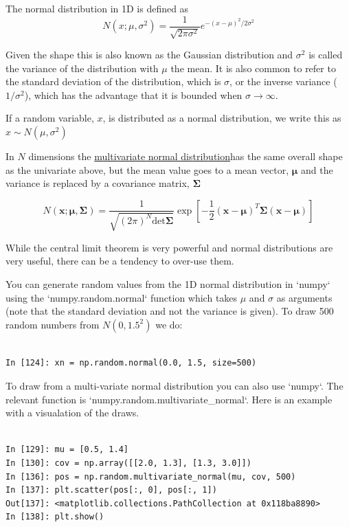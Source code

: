 \documentclass[a4paper,10pt]{article}
\begin{document}
The normal distribution in 1D is defined as
$$N(x; \mu, \sigma^2)= \frac{1}{\sqrt{2\pi {\sigma^2}}} e^{-(x-\mu)^2/2\sigma^2}$$

Given the shape this is also known as the Gaussian distribution and $\sigma^2$ is called the variance of the distribution with $\mu$ the mean. It is also common to refer to the standard deviation of the distribution, which is $\sigma$, or the inverse variance ($1/\sigma^2$), which has the advantage that it is bounded when $\sigma \to \infty$.

If a random variable, $x$, is distributed as a normal distribution, we write this as $x\sim N(\mu, \sigma^2)$

In $N$ dimensions the \href{https://en.wikipedia.org/wiki/Multivariate_normal_distribution}{multivariate normal distribution}has the same overall shape as the univariate above, but the mean value goes to a mean vector, $\mathbf{\mu}$ and the variance is replaced by a covariance matrix, $\mathbf{\Sigma}$


$$N(\mathbf{x}; \mathbf{\mu}, \mathbf{\Sigma})= \frac{1}{\sqrt{ (2\pi)^N \mathrm{det} \mathbf{\Sigma}}} \exp \left[-\frac{1}{2} (\mathbf{x} - \boldsymbol{\mu})^T  \mathbf{\Sigma} (\mathbf{x} - \boldsymbol{\mu})  \right] $$


While the central limit theorem is very powerful and normal distributions are very useful, there can be a tendency to over-use them.

You can generate random values from the 1D normal distribution in `numpy` using the `numpy.random.normal` function which takes $\mu$ and $\sigma$ as arguments (note that the standard deviation and not the variance is given). To draw 500 random numbers from $N(0, 1.5^2)$ we do:
\begin{lstlisting}

In [124]: xn = np.random.normal(0.0, 1.5, size=500)
\end{lstlisting}

To draw from a multi-variate normal distribution you can also use `numpy`. The relevant function is `numpy.random.multivariate\_normal`. Here is an example with a visualation of the draws.
\begin{lstlisting}

In [129]: mu = [0.5, 1.4]
In [130]: cov = np.array([[2.0, 1.3], [1.3, 3.0]])
In [136]: pos = np.random.multivariate_normal(mu, cov, 500)
In [137]: plt.scatter(pos[:, 0], pos[:, 1])
Out[137]: <matplotlib.collections.PathCollection at 0x118ba8890>
In [138]: plt.show()
\end{lstlisting}
\end{document}

